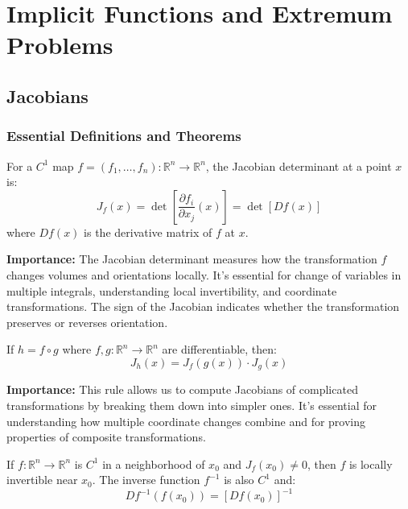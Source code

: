 \chapter{Implicit Functions and Extremum Problems}

\section{Jacobians}

\subsection*{Essential Definitions and Theorems}

\begin{definition}
For a $C^1$ map $f = (f_1, \ldots, f_n): \mathbb{R}^n \to \mathbb{R}^n$, the Jacobian determinant at a point $x$ is:
\[J_f(x) = \det\left[\frac{\partial f_i}{\partial x_j}(x)\right] = \det[Df(x)]\]
where $Df(x)$ is the derivative matrix of $f$ at $x$.
\end{definition}

\noindent\textbf{Importance:} The Jacobian determinant measures how the transformation $f$ changes volumes and orientations locally. It's essential for change of variables in multiple integrals, understanding local invertibility, and coordinate transformations. The sign of the Jacobian indicates whether the transformation preserves or reverses orientation.



\begin{definition}
If $h = f \circ g$ where $f, g: \mathbb{R}^n \to \mathbb{R}^n$ are differentiable, then:
\[J_h(x) = J_f(g(x)) \cdot J_g(x)\]
\end{definition}

\noindent\textbf{Importance:} This rule allows us to compute Jacobians of complicated transformations by breaking them down into simpler ones. It's essential for understanding how multiple coordinate changes combine and for proving properties of composite transformations.



\begin{theorem}
If $f: \mathbb{R}^n \to \mathbb{R}^n$ is $C^1$ in a neighborhood of $x_0$ and $J_f(x_0) \neq 0$, then $f$ is locally invertible near $x_0$. The inverse function $f^{-1}$ is also $C^1$ and:
\[Df^{-1}(f(x_0)) = [Df(x_0)]^{-1}\]
\end{theorem}

